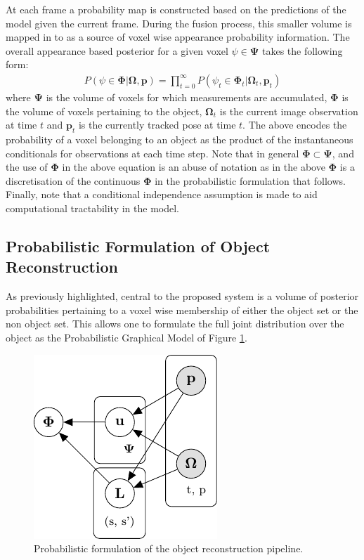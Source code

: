 At each frame a probability map is constructed based on the predictions of the model given the current frame. During the fusion process, this 
smaller volume is mapped in to as a source of voxel wise appearance probability information. The overall appearance based posterior for a given voxel 
$\psi \in \mathbf{\Psi}$ takes the following form:
\begin{equation}
\begin{split}
P(\psi \in \mathbf{\Phi} | \mathbf{\Omega}, \mathbf{p}) = \prod_{t=0}^{\infty} P(\psi_{t} \in \mathbf{\Phi}_{t} | \mathbf{\Omega}_{t}, \mathbf{p}_{t})
\end{split}
\end{equation}
where $\mathbf{\Psi}$ is the volume of voxels for which measurements are accumulated, $\mathbf{\Phi}$ 
is the volume of voxels pertaining to the object, $\mathbf{\Omega}_{t}$ is the current image observation at time $t$ and $\mathbf{p}_{t}$ is the 
currently tracked pose at time $t$.
The above encodes the probability of a voxel belonging to an object as the product of the instantaneous conditionals for observations at each time step. 
Note that in general $\mathbf{\Phi} \subset \mathbf{\Psi}$, and the use of $\mathbf{\Phi}$ in the above equation is an abuse of notation as in the above 
$\mathbf{\Phi}$ is a discretisation of the continuous $\mathbf{\Phi}$ in the probabilistic formulation that follows. Finally, note that a conditional 
independence assumption is made to aid computational tractability in the model.

\subsection{Probabilistic Formulation of Object Reconstruction}
As previously highlighted, central to the proposed system is a volume of posterior probabilities pertaining to a voxel wise membership of either the 
object set or the non object set. This allows one to formulate the full joint distribution over the object as the Probabilistic 
Graphical Model of Figure \ref{pgm1}.
\begin{figure}[h]
	\centering
	\includegraphics{graphical_models/pgm1.pdf}
	\caption{Probabilistic formulation of the object reconstruction pipeline.}
	\label{pgm1}
\end{figure}

